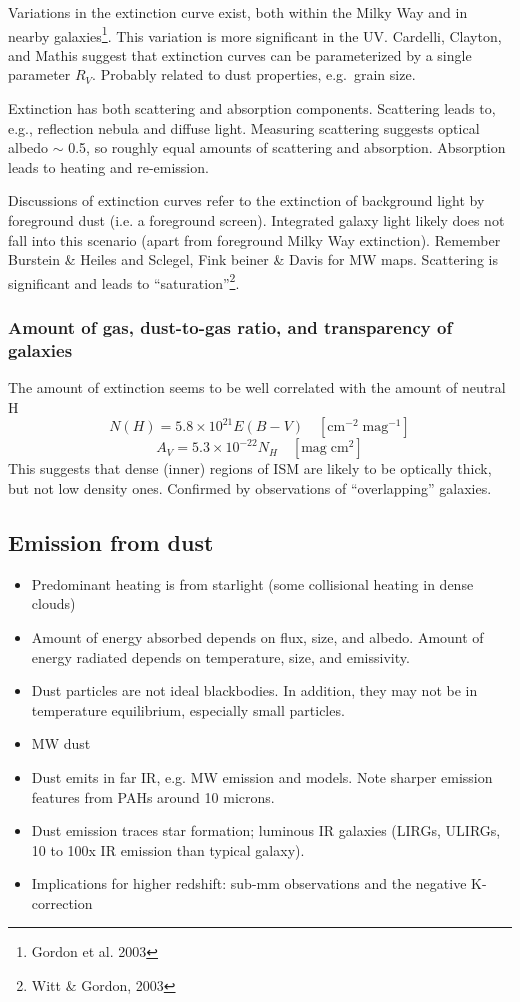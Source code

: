 \documentclass{article}
\begin{document}
Variations in the extinction curve exist, both within the Milky Way
and in nearby galaxies\footnote{Gordon et al. 2003}. This variation is
more significant in the UV. Cardelli, Clayton, and Mathis suggest that
extinction curves can be parameterized by a single parameter $R_{V}$.
Probably related to dust properties, e.g.\ grain size.

Extinction has both scattering and absorption components. Scattering
leads to, e.g., reflection nebula and diffuse light. Measuring scattering
suggests optical albedo $\sim$ 0.5, so roughly equal amounts of scattering
and absorption. Absorption leads to heating and re-emission.

Discussions of extinction curves refer to the extinction of background light by
foreground dust (i.e. a foreground screen). Integrated galaxy light likely does
not fall into this scenario (apart from foreground Milky Way extinction).
Remember Burstein \& Heiles and Sclegel, Fink beiner \& Davis for MW maps.
Scattering is significant and leads to ``saturation''\footnote{Witt \&
Gordon, 2003}.

\subsubsection{Amount of gas, dust-to-gas ratio, and transparency of galaxies}
The amount of extinction seems to be well correlated with the amount of
neutral H
\[
    N(H) = 5.8\times10^{21}E(B-V)\quad
    \left[\mathrm{cm}^{-2}\;\mathrm{mag}^{-1}\right]
\]\[
    A_{V} = 5.3\times10^{-22}N_{H}\quad
    \left[\mathrm{mag}\;\mathrm{cm}^{2}\right]
\]
This suggests that dense (inner) regions of ISM are likely to be optically
thick, but not low density ones. Confirmed by observations of ``overlapping''
galaxies.

\subsection{Emission from dust}
\begin{itemize}
    \item Predominant heating is from starlight (some collisional
        heating in dense clouds)
    \item Amount of energy absorbed depends on flux, size, and albedo.
        Amount of energy radiated depends on temperature, size, and emissivity.
    \item Dust particles are not ideal blackbodies. In addition, they may not
        be in temperature equilibrium, especially small particles.
    \item MW dust
    \item Dust emits in far IR, e.g. MW emission and models. Note sharper
        emission features from PAHs around 10 microns.
    \item Dust emission traces star formation; luminous IR galaxies
        (LIRGs, ULIRGs, 10 to 100x IR emission than typical galaxy).
    \item Implications for higher redshift: sub-mm observations and
        the negative K-correction
\end{itemize}
\end{document}
